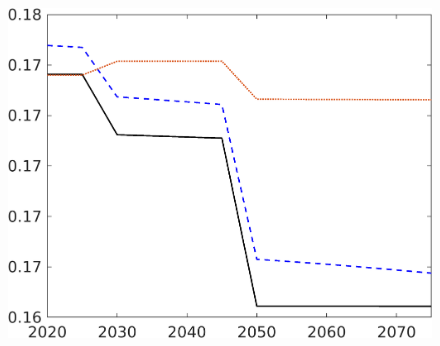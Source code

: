 \begin{figure}[h!!]
\begin{minipage}[]{0.32\textwidth}
\end{minipage}
\begin{minipage}[]{0.32\textwidth}
	\includegraphics[width=1\textwidth]{../../codding_model/own_basedOnFried/optimalPol_elastS_DisuSci/figures/all_1705/Ln_CompEffOPT_T_NoTaus_spillover0_sep1_BN0_ineq0_etaa0.79_lgd0.png}
\end{minipage}
\end{figure}

